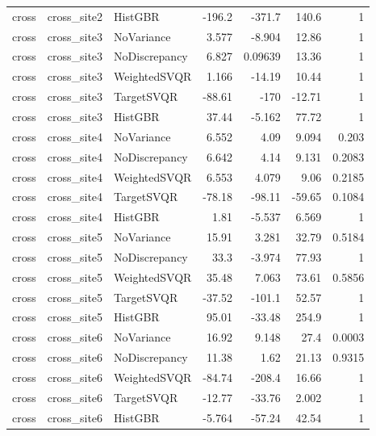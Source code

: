 \begin{longtable}{lllrrrr}
cross & cross\_site2 & HistGBR & -196.2 & -371.7 & 140.6 & 1 \\
cross & cross\_site3 & NoVariance & 3.577 & -8.904 & 12.86 & 1 \\
cross & cross\_site3 & NoDiscrepancy & 6.827 & 0.09639 & 13.36 & 1 \\
cross & cross\_site3 & WeightedSVQR & 1.166 & -14.19 & 10.44 & 1 \\
cross & cross\_site3 & TargetSVQR & -88.61 & -170 & -12.71 & 1 \\
cross & cross\_site3 & HistGBR & 37.44 & -5.162 & 77.72 & 1 \\
cross & cross\_site4 & NoVariance & 6.552 & 4.09 & 9.094 & 0.203 \\
cross & cross\_site4 & NoDiscrepancy & 6.642 & 4.14 & 9.131 & 0.2083 \\
cross & cross\_site4 & WeightedSVQR & 6.553 & 4.079 & 9.06 & 0.2185 \\
cross & cross\_site4 & TargetSVQR & -78.18 & -98.11 & -59.65 & 0.1084 \\
cross & cross\_site4 & HistGBR & 1.81 & -5.537 & 6.569 & 1 \\
cross & cross\_site5 & NoVariance & 15.91 & 3.281 & 32.79 & 0.5184 \\
cross & cross\_site5 & NoDiscrepancy & 33.3 & -3.974 & 77.93 & 1 \\
cross & cross\_site5 & WeightedSVQR & 35.48 & 7.063 & 73.61 & 0.5856 \\
cross & cross\_site5 & TargetSVQR & -37.52 & -101.1 & 52.57 & 1 \\
cross & cross\_site5 & HistGBR & 95.01 & -33.48 & 254.9 & 1 \\
cross & cross\_site6 & NoVariance & 16.92 & 9.148 & 27.4 & 0.0003 \\
cross & cross\_site6 & NoDiscrepancy & 11.38 & 1.62 & 21.13 & 0.9315 \\
cross & cross\_site6 & WeightedSVQR & -84.74 & -208.4 & 16.66 & 1 \\
cross & cross\_site6 & TargetSVQR & -12.77 & -33.76 & 2.002 & 1 \\
cross & cross\_site6 & HistGBR & -5.764 & -57.24 & 42.54 & 1 \\
\end{longtable}
